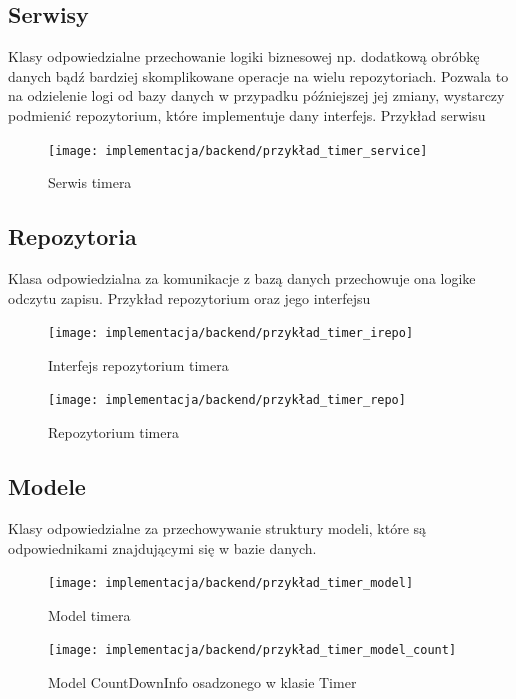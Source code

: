 \documentclass[a4paper,11pt]{report}
\begin{document}
\subsection{Serwisy}
Klasy odpowiedzialne przechowanie logiki biznesowej np. dodatkową obróbkę danych bądź bardziej skomplikowane operacje na wielu repozytoriach.
Pozwala to na odzielenie logi od bazy danych w przypadku późniejszej jej zmiany, wystarczy podmienić repozytorium, które implementuje dany interfejs.
Przykład serwisu
\begin{figure}[H]
	\centering
	\texttt{[image: implementacja/backend/przykład\_timer\_service]}\\
	\caption{Serwis timera}
	\label{fig:przykład_timer_service}
\end{figure}
\subsection{Repozytoria}
Klasa odpowiedzialna za komunikacje z bazą danych przechowuje ona logike odczytu zapisu. 
Przykład repozytorium oraz jego interfejsu
\begin{figure}[H]
	\centering
	\texttt{[image: implementacja/backend/przykład\_timer\_irepo]}\\
	\caption{Interfejs repozytorium timera}
	\label{fig:przykład_timer_irepo}
\end{figure}
\begin{figure}[H]
	\centering
	\texttt{[image: implementacja/backend/przykład\_timer\_repo]}\\
	\caption{Repozytorium timera}
	\label{fig:przykład_timer_repo}
\end{figure}
\subsection{Modele}
Klasy odpowiedzialne za przechowywanie struktury modeli, które są odpowiednikami znajdującymi się w bazie danych.
\begin{figure}[H]
	\centering
	\texttt{[image: implementacja/backend/przykład\_timer\_model]}\\
	\caption{Model timera}
	\label{fig:przykład_timer_model}
\end{figure}
\begin{figure}[H]
	\centering
	\texttt{[image: implementacja/backend/przykład\_timer\_model\_count]}\\
	\caption{Model CountDownInfo osadzonego w klasie Timer}
	\label{fig:przykład_timer_model_count}
\end{figure}
\end{document}
